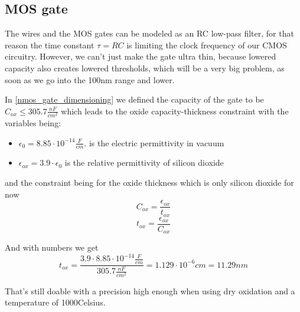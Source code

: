\subsection{MOS gate}
The wires and the MOS gates can be modeled as an RC low-pass filter, for that reason the time constant $\tau=RC$ is limiting the clock frequency of our CMOS circuitry.
However, we can't just make the gate ultra thin, because lowered capacity also creates lowered thresholds, which will be a very big problem, as soon as we go into the 100nm range and lower.

In \autoref{nmos_gate_dimensioning} we defined the capacity of the gate to be $C_{ox} \leq 305.7 \frac{nF}{cm^2}$ which leads to the oxide capacity-thickness constraint with the variables being:
\begin{itemize}
\item $\epsilon_0 = 8.85 \cdot 10^{-14}\frac{F}{cm}. $ is the electric permittivity in vacuum
\item $\epsilon_{ox} =3.9 \cdot \epsilon_0$ is the relative permittivity of silicon dioxide
\end{itemize}
and the constraint being for the oxide thickness which is only silicon dioxide for now
\begin{equation}
C_{ox}
=
\frac{\epsilon_{ox}}{t_{ox}}
\end{equation}
\begin{equation}
t_{ox}
=
\frac{\epsilon_{ox}}{C_{ox}}
\end{equation}

And with numbers we get
\begin{equation}
t_{ox}
=
\frac{3.9 \cdot 8.85 \cdot 10^{-14}\frac{F}{cm}}{305.7 \frac{nF}{cm^2}}
=
1.129 \cdot 10^{-6} cm
=
11.29nm
\end{equation}

That's still doable with a precision high enough when using dry oxidation and a temperature of 1000\degree Celsius.